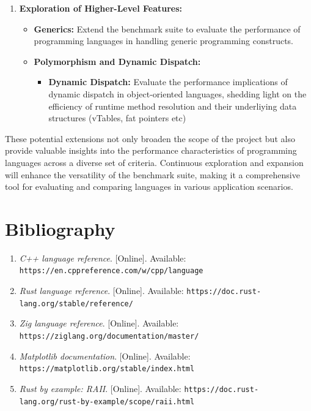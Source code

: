 \documentclass{article}
\begin{document}
\begin{enumerate}
    \item \textbf{Exploration of Higher-Level Features:}
    \begin{itemize}
        \item \textbf{Generics:} Extend the benchmark suite to evaluate the performance of programming languages in handling generic programming constructs.
        \item \textbf{Polymorphism and Dynamic Dispatch:}
            \begin{itemize}
                \item \textbf{Dynamic Dispatch:} Evaluate the performance implications of dynamic dispatch in object-oriented languages, shedding light on the efficiency of runtime method resolution and their underliying data structures (vTables, fat pointers etc)
            \end{itemize}
    \end{itemize}
\end{enumerate}

These potential extensions not only broaden the scope of the project but also provide valuable insights into the performance characteristics of programming languages across a diverse set of criteria. Continuous exploration and expansion will enhance the versatility of the benchmark suite, making it a comprehensive tool for evaluating and comparing languages in various application scenarios.

\clearpage


\section{Bibliography}
\begin{enumerate}
    \item \textit{C++ language reference}. [Online]. Available: \texttt{https://en.cppreference.com/w/cpp/language}
    \item \textit{Rust language reference}. [Online]. Available: \texttt{https://doc.rust-lang.org/stable/reference/}
    \item \textit{Zig language reference}. [Online]. Available: \texttt{https://ziglang.org/documentation/master/}
    \item \textit{Matplotlib documentation}. [Online]. Available: \texttt{https://matplotlib.org/stable/index.html}
    \item \textit{Rust by example: RAII}. [Online]. Available: \texttt{https://doc.rust-lang.org/rust-by-example/scope/raii.html}
\end{enumerate}
\end{document}
